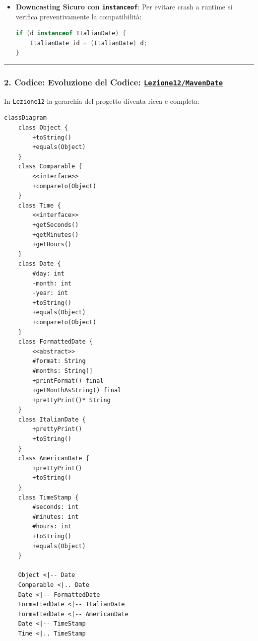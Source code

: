 \documentclass[11pt,a4paper]{article}
\newcommand{\passthrough}[1]{#1}
\providecommand{\tightlist}{\setlength{\itemsep}{0pt}\setlength{\parskip}{0pt}}
\begin{document}
\begin{itemize}
\begin{itemize}
    \begin{itemize}
    \tightlist
    \item
      Se l'oggetto concreto nello Heap è effettivamente un'istanza
      compatibile, il cast ha successo.
    \item
      Se l'oggetto concreto nello Heap è di tipo diverso (es. un
      \passthrough{\lstinline!Date!} generico o un
      \passthrough{\lstinline!AmericanDate!}), la JVM interrompe
      l'esecuzione e lancia una
      \textbf{\passthrough{\lstinline!ClassCastException!}}!
    \end{itemize}
  \item
    \textbf{Downcasting Sicuro con
    \passthrough{\lstinline!instanceof!}}: Per evitare crash a runtime
    si verifica preventivamente la compatibilità:

\begin{lstlisting}[language=Java]
if (d instanceof ItalianDate) {
    ItalianDate id = (ItalianDate) d;
}
\end{lstlisting}
  \end{itemize}
\end{itemize}

\begin{center}\rule{0.5\linewidth}{0.5pt}\end{center}

\subsubsection{\texorpdfstring{2. Codice: Evoluzione del Codice:
\href{file:///home/wally/Documenti/GitHub/Programmazione-II/25-26/Teoria-e-Esercitazioni/Codice-20260902/Lezione12/MavenDate}{\texttt{Lezione12/MavenDate}}}{2. Codice: Evoluzione del Codice: Lezione12/MavenDate}}\label{codice-evoluzione-del-codice-lezione12mavendate}

In \passthrough{\lstinline!Lezione12!} la gerarchia del progetto diventa
ricca e completa:

\begin{lstlisting}
classDiagram
    class Object {
        +toString()
        +equals(Object)
    }
    class Comparable {
        <<interface>>
        +compareTo(Object)
    }
    class Time {
        <<interface>>
        +getSeconds()
        +getMinutes()
        +getHours()
    }
    class Date {
        #day: int
        -month: int
        -year: int
        +toString()
        +equals(Object)
        +compareTo(Object)
    }
    class FormattedDate {
        <<abstract>>
        #format: String
        #months: String[]
        +printFormat() final
        +getMonthAsString() final
        +prettyPrint()* String
    }
    class ItalianDate {
        +prettyPrint()
        +toString()
    }
    class AmericanDate {
        +prettyPrint()
        +toString()
    }
    class TimeStamp {
        #seconds: int
        #minutes: int
        #hours: int
        +toString()
        +equals(Object)
    }

    Object <|-- Date
    Comparable <|.. Date
    Date <|-- FormattedDate
    FormattedDate <|-- ItalianDate
    FormattedDate <|-- AmericanDate
    Date <|-- TimeStamp
    Time <|.. TimeStamp
\end{lstlisting}
\end{document}
